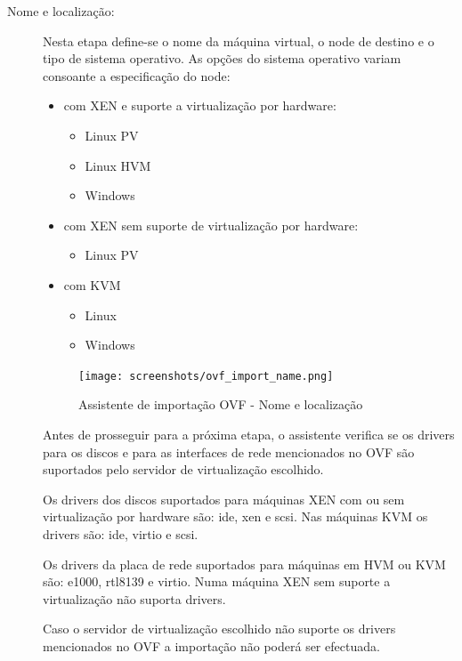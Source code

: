 \begin{description}
    \item[Nome e localização:] Nesta etapa define-se o nome da máquina virtual, o node de destino e o tipo de sistema operativo. As opções do sistema operativo variam consoante a especificação do node:
		\begin{itemize}
			\item com XEN e suporte a virtualização por hardware:
			\begin{itemize}
				\item Linux PV
				\item Linux HVM
				\item Windows
			\end{itemize}
 			\item com XEN sem suporte de virtualização por hardware:
			\begin{itemize}
				\item Linux PV
			\end{itemize}
 			\item com KVM
			\begin{itemize}
				\item Linux
				\item Windows
			\end{itemize}
		\end{itemize}

        \begin{figure}[H]
            \begin{center}
            \texttt{[image: screenshots/ovf\_import\_name.png]}
            \caption{Assistente de importação OVF - Nome e localização}
            \label{fig:ovf_import_name}
            \end{center}
        \end{figure}

        Antes de prosseguir para a próxima etapa, o assistente verifica se os drivers para os discos e para as interfaces de rede mencionados no OVF são suportados pelo servidor de virtualização escolhido.

        Os drivers dos discos suportados para máquinas XEN com ou sem virtualização por hardware são: ide, xen e scsi. Nas máquinas KVM os drivers são: ide, virtio e scsi.

        Os drivers da placa de rede suportados para máquinas em HVM ou KVM são: e1000, rtl8139 e virtio. Numa máquina XEN sem suporte a virtualização não suporta drivers.

        Caso o servidor de virtualização escolhido não suporte os drivers mencionados no OVF a importação não poderá ser efectuada.



\end{description}

